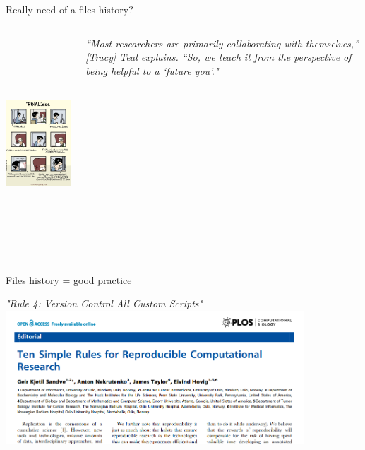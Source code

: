 \begin{frame}{Really need of a files history?}
\begin{columns}
  \begin{center}
        \href{http://phdcomics.com/comics/archive.php?comicid=1531}{\includegraphics[height=8cm]{05_history/Images/FAIR_git_comic_phd101212s.png}}
  \end{center}
  \begin{center}
     \textit{“Most researchers are primarily collaborating with themselves,” [Tracy] Teal explains. “So, we teach it from the perspective of being helpful to a ‘future you’." }
   \end{center}
\end{columns}
\end{frame}
\begin{frame}{Files history = good practice}
\begin{center}
    \textit{"Rule 4: Version Control All Custom Scripts"}\\
    \href{https://journals.plos.org/ploscompbiol/article?id=10.1371/journal.pcbi.1003285}{\includegraphics[height=5cm]{05_history/Images/FAIR_10simplesRules.png}}
\end{center}
\end{frame}
